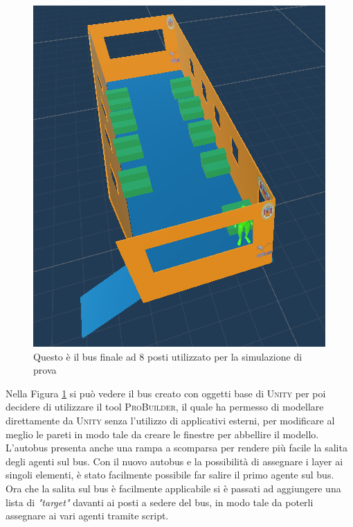 \documentclass[12pt, openany]{book}
\begin{document}
	\begin{figure}[H]
		\centering
		\includegraphics[width=1\linewidth]{"Immagini/BasicBus.png"}
		\caption{Questo è il bus finale ad 8 posti utilizzato per la simulazione di prova}
		\label{fig:BasicBus}
	\end{figure}
	Nella Figura \ref{fig:BasicBus} si può vedere il bus creato con oggetti base di \textsc{Unity} per poi decidere di utilizzare il tool \textsc{ProBuilder}, il quale ha permesso di modellare direttamente da \textsc{Unity} senza l'utilizzo di applicativi esterni, per modificare al meglio le pareti in modo tale da creare le finestre per abbellire il modello. L'autobus presenta anche una rampa a scomparsa per rendere più facile la salita degli agenti sul bus.
	Con il nuovo autobus e la possibilità di assegnare i layer ai singoli elementi, è stato facilmente possibile far salire il primo agente sul bus.\\
	Ora che la salita sul bus è facilmente applicabile si è passati ad aggiungere una lista di \emph{"target"} davanti ai posti a sedere del bus, in modo tale da poterli assegnare ai vari agenti tramite script.
\end{document}
